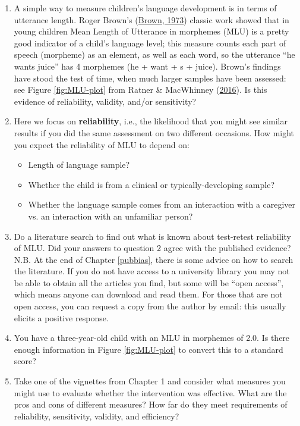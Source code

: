 \documentclass{krantz}
\providecommand{\tightlist}{%
\setlength{\itemsep}{0pt}\setlength{\parskip}{0pt}}
\begin{document}
\begin{enumerate}
\def\labelenumi{\arabic{enumi}.}
\item
  A simple way to measure children's language development is in terms of utterance length. Roger Brown's (\protect\hyperlink{ref-brown1973}{Brown, 1973}) classic work showed that in young children Mean Length of Utterance in morphemes (MLU) is a pretty good indicator of a child's language level; this measure counts each part of speech (morpheme) as an element, as well as each word, so the utterance ``he wants juice'' has 4 morphemes (he + want + s + juice). Brown's findings have stood the test of time, when much larger samples have been assessed: see Figure \ref{fig:MLU-plot} from Ratner \& MacWhinney (\protect\hyperlink{ref-ratner2016}{2016}). Is this evidence of reliability, validity, and/or sensitivity?
\item
  Here we focus on \textbf{reliability}, i.e., the likelihood that you might see similar results if you did the same assessment on two different occasions. How might you expect the reliability of MLU to depend on:




\begin{itemize}
\tightlist
\item
  Length of language sample?
\item
  Whether the child is from a clinical or typically-developing sample?
\item
  Whether the language sample comes from an interaction with a caregiver vs. an interaction with an unfamiliar person?
\end{itemize}




\def\labelenumi{\arabic{enumi}.}
\setcounter{enumi}{2}
\item
  Do a literature search to find out what is known about test-retest reliability of MLU. Did your answers to question 2 agree with the published evidence? N.B. At the end of Chapter \ref{pubbias}, there is some advice on how to search the literature. If you do not have access to a university library you may not be able to obtain all the articles you find, but some will be ``open access'', which means anyone can download and read them. For those that are not open access, you can request a copy from the author by email: this usually elicits a positive response.
\item
  You have a three-year-old child with an MLU in morphemes of 2.0. Is there enough information in Figure \ref{fig:MLU-plot} to convert this to a standard score?
\item
  Take one of the vignettes from Chapter 1 and consider what measures you might use to evaluate whether the intervention was effective. What are the pros and cons of different measures? How far do they meet requirements of reliability, sensitivity, validity, and efficiency?
\end{enumerate}
\end{document}
